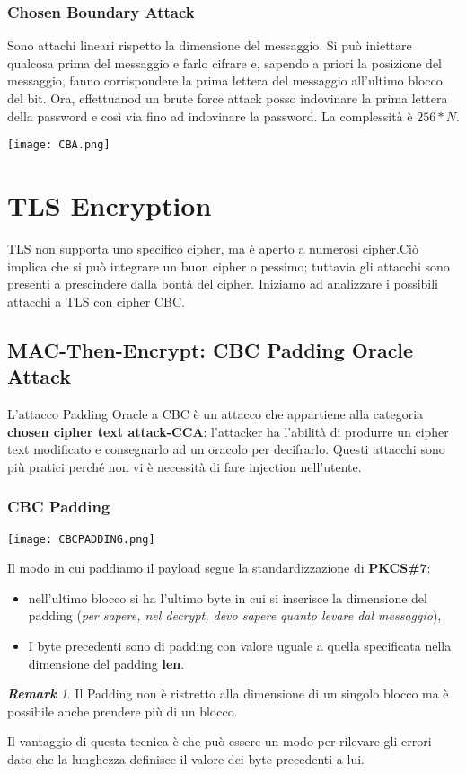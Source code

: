 \documentclass{article}
\theoremstyle{remark}
\newtheorem*{remark}{\textbf{Remark}}
\begin{document}
\subsubsection{Chosen Boundary Attack}
Sono attachi lineari rispetto la dimensione del messaggio. Si può iniettare qualcosa prima del messaggio e farlo cifrare e, sapendo a priori la posizione del messaggio, fanno corrispondere la prima lettera del messaggio all'ultimo blocco del bit. Ora, effettuanod un brute force attack posso indovinare la prima lettera della password e così via fino ad indovinare la password. La complessità è $256*N$.
\begin{center}
    \texttt{[image: CBA.png]}
\end{center}
\section{TLS Encryption}
TLS non supporta uno specifico cipher, ma è aperto a numerosi cipher.Ciò implica che si può integrare un buon cipher o pessimo; tuttavia gli attacchi sono presenti a prescindere dalla bontà del cipher. \newline
Iniziamo ad analizzare i possibili attacchi a TLS con cipher CBC.
\subsection{MAC-Then-Encrypt: CBC Padding Oracle Attack}
L'attacco Padding Oracle a CBC è un attacco che appartiene alla categoria \textbf{chosen cipher text attack-CCA}: l'attacker ha l'abilità di produrre un cipher text modificato e consegnarlo ad un oracolo per decifrarlo. Questi attacchi sono più pratici perché non vi è necessità di fare injection nell'utente.
\subsubsection{CBC Padding}
\begin{center}
    \texttt{[image: CBCPADDING.png]}
\end{center}
Il modo in cui paddiamo il payload segue la standardizzazione di \textbf{ PKCS\#7}: 
\begin{itemize}
    \item nell'ultimo blocco si ha l'ultimo byte in cui si inserisce la dimensione del padding (\emph{per sapere, nel decrypt, devo sapere quanto levare dal messaggio}),
    \item I byte precedenti sono di padding con valore uguale a quella specificata nella dimensione del padding \textbf{len}.
\end{itemize}
\begin{remark}
Il Padding non è ristretto alla dimensione di un singolo blocco ma è possibile anche prendere più di un blocco.
\end{remark}
Il vantaggio di questa tecnica è che può essere un modo per rilevare gli errori dato che la lunghezza definisce il valore dei byte precedenti a lui.
\end{document}

